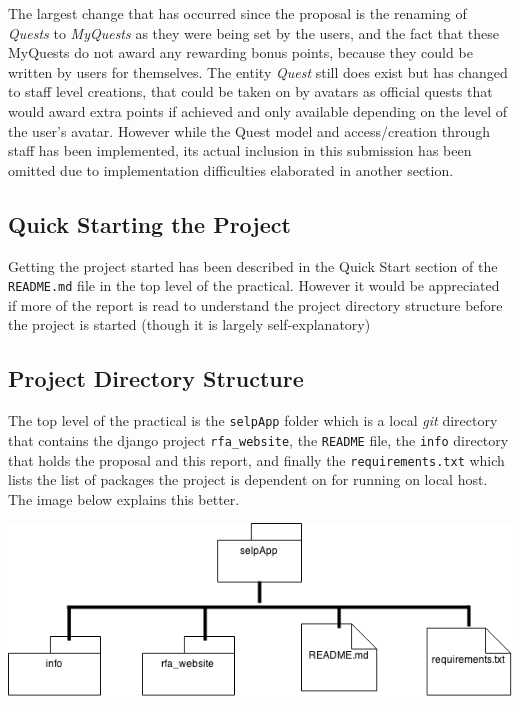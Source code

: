 \documentclass[11pt,a4paper]{article}
\begin{document}
The largest change that has occurred since the proposal is the renaming of \textit{Quests} to \textit{MyQuests} as they were being set by the users, and the fact that these MyQuests do not award any rewarding bonus points, because they could be written by users for themselves. The entity \textit{Quest} still does exist but has changed to staff level creations, that could be taken on by avatars as official quests that would award extra points if achieved and only available depending on the level of the user's avatar. However while the Quest model and access/creation through staff has been implemented, its actual inclusion in this submission has been omitted due to implementation difficulties elaborated in another section.

\subsection{Quick Starting the Project}
Getting the project started has been described in the Quick Start section of the \verb|README.md| file in the top level of the practical. However it would be appreciated if more of the report is read to understand the project directory structure before the project is started (though it is largely self-explanatory)

\subsection{Project Directory Structure}
The top level of the practical is the \verb|selpApp| folder which is a local \textit{git} directory that contains the django project \verb|rfa_website|, the \verb|README| file, the \verb|info| directory that holds the proposal and this report, and finally the \verb|requirements.txt| which lists the list of packages the project is dependent on for running on local host. The image below explains this better.

\begin{center}
\includegraphics[scale=0.5]{selpProjectStructure.png} \\
\end{center}
\end{document}
